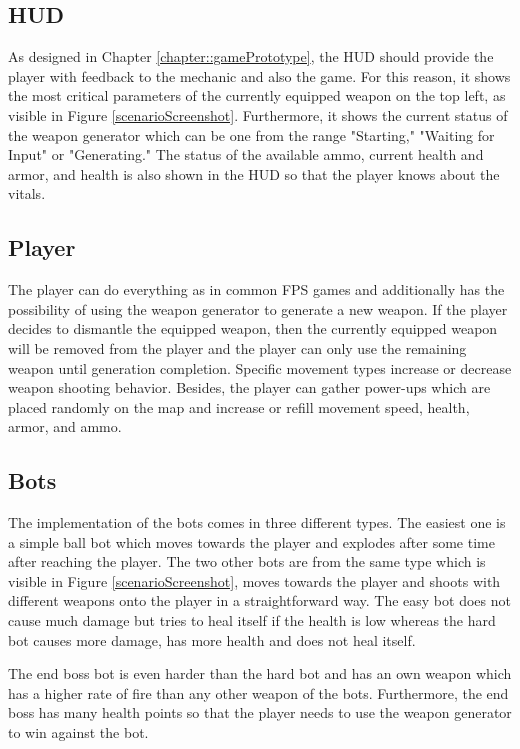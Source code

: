 \documentclass[MGS,Master,english]{twbook}%
\begin{document}
\subsection{\acl{HUD}}
As designed in Chapter \ref{chapter::gamePrototype}, the HUD should provide the player with feedback to the mechanic and also the game. For this reason, it shows the most critical parameters of the currently equipped weapon on the top left, as visible in Figure \ref{scenarioScreenshot}. Furthermore, it shows the current status of the weapon generator which can be one from the range "Starting," "Waiting for Input" or "Generating." The status of the available ammo, current health and armor, and health is also shown in the HUD so that the player knows about the vitals.

\subsection{Player}
The player can do everything as in common FPS games and additionally has the possibility of using the weapon generator to generate a new weapon. If the player decides to dismantle the equipped weapon, then the currently equipped weapon will be removed from the player and the player can only use the remaining weapon until generation completion. Specific movement types increase or decrease weapon shooting behavior. Besides, the player can gather power-ups which are placed randomly on the map and increase or refill movement speed, health, armor, and ammo.

\subsection{Bots}
The implementation of the bots comes in three different types. The easiest one is a simple ball bot which moves towards the player and explodes after some time after reaching the player. The two other bots are from the same type  which is visible in Figure \ref{scenarioScreenshot}, moves towards the player and shoots with different weapons onto the player in a straightforward way. The easy bot does not cause much damage but tries to heal itself if the health is low whereas the hard bot causes more damage, has more health and does not heal itself.

The end boss bot is even harder than the hard bot and has an own weapon which has a higher rate of fire than any other weapon of the bots. Furthermore, the end boss has many health points so that the player needs to use the weapon generator to win against the bot.
\end{document}
